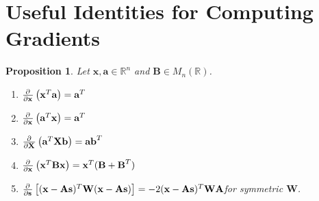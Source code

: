 \documentclass[12pt,openany]{book}
\newtheorem{proposition}[theorem]{Proposition}
\theoremstyle{definition}
\newcommand{\R}{\mathbb{R}}
\newcommand{\of}[1]{\left( #1 \right)}
\renewcommand{\vec}[1]{\textbf{#1}}
\begin{document}
\section{Useful Identities for Computing Gradients}
\begin{tcolorbox}[colframe=procolor,title={\color{white}\bf }]
	\begin{proposition}
		Let $\vec{x},\vec{a}\in\R^n$ and $\vec{B}\in M_{n}(\R)$. \begin{enumerate}[(1)]
			\item $\pd{}{\vec{x}}\of{\vec{x}^T\vec{a}}=\vec{a}^T$
			\item $\pd{}{\vec{x}}\of{\vec{a}^T\vec{x}}=\vec{a}^T$
			\item $\pd{}{\vec{X}}\of{\vec{a}^T\vec{X}\vec{b}}=\vec{a}\vec{b}^T$
			\item $\pd{}{\vec{x}}\of{\vec{x}^T\vec{B}\vec{x}}=\vec{x}^T(\vec{B}+\vec{B}^T)$
			\item $\pd{}{\vec{s}}\sbr{(\vec{x}-\vec{A}\vec{s})^T\vec{W}(\vec{x}-\vec{A}\vec{s})}=-2(\vec{x}-\vec{A}\vec{s})^T\vec{W}\vec{A}$\quad for symmetric $\vec{W}$.
		\end{enumerate}
	\end{proposition}
\end{tcolorbox}
\end{document}
